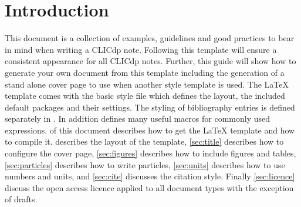 %

\newcommand{\latex}{\LaTeX\xspace}
\lstset{defaultdialect=[LaTeX]TeX}

\section{Introduction}
\label{sec:Intro}
This document is a collection of examples, guidelines and good practices to bear in mind when writing a CLICdp note. Following this template will ensure a consistent appearance for all CLICdp notes. Further, this guide will show how to generate your own document from this template including the generation of a stand alone cover page to use when another style template is used. The \latex template comes with the basic style file  which defines the layout, the included default packages and their settings. The styling of bibliography entries is defined separately in . In addition  defines many useful macros for commonly used expressions.  of this document describes how to get the \latex template and how to compile it.  describes the layout of the template, \cref{sec:title} describes how to configure the cover page, \cref{sec:figures} describes how to include figures and tables, \cref{sec:particles} describes how to write particles, \cref{sec:units} describes how to use numbers and units, and \cref{sec:cite} discusses the citation style. Finally \cref{sec:licence} discuss the open access licence applied to all document types with the exception of drafts.

